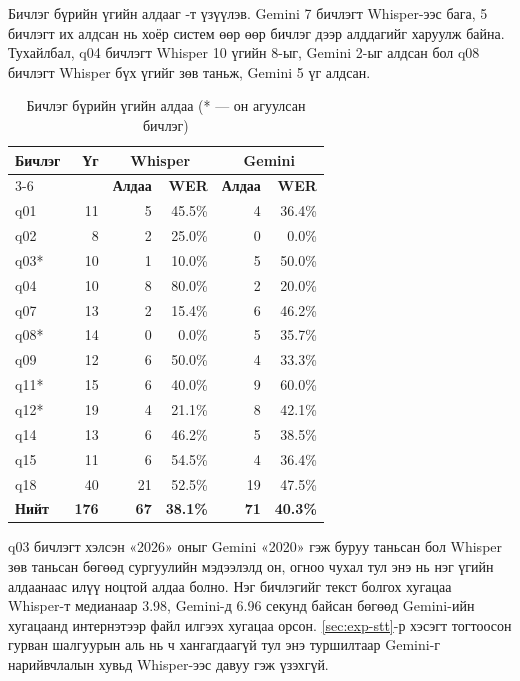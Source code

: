 Бичлэг бүрийн үгийн алдааг -т үзүүлэв. Gemini 7 бичлэгт Whisper-ээс бага, 5 бичлэгт их алдсан нь хоёр систем өөр өөр бичлэг дээр алддагийг харуулж байна. Тухайлбал, q04 бичлэгт Whisper 10 үгийн 8-ыг, Gemini 2-ыг алдсан бол q08 бичлэгт Whisper бүх үгийг зөв таньж, Gemini 5 үг алдсан.

\begin{table}[htbp]
\centering
\caption{Бичлэг бүрийн үгийн алдаа (* — он агуулсан бичлэг)}
\label{tab:stt_per_utt}
\begin{tabular}{|l|r|r|r|r|r|}
\hline
\multirow{2}{*}{\textbf{Бичлэг}} & \multirow{2}{*}{\textbf{Үг}} & \multicolumn{2}{c|}{\textbf{Whisper}} & \multicolumn{2}{c|}{\textbf{Gemini}} \\
\cline{3-6}
 & & \textbf{Алдаа} & \textbf{\acs{WER}} & \textbf{Алдаа} & \textbf{\acs{WER}} \\
\hline
q01 & 11 & 5 & 45.5\% & 4 & 36.4\% \\
q02 & 8 & 2 & 25.0\% & 0 & 0.0\% \\
q03* & 10 & 1 & 10.0\% & 5 & 50.0\% \\
q04 & 10 & 8 & 80.0\% & 2 & 20.0\% \\
q07 & 13 & 2 & 15.4\% & 6 & 46.2\% \\
q08* & 14 & 0 & 0.0\% & 5 & 35.7\% \\
q09 & 12 & 6 & 50.0\% & 4 & 33.3\% \\
q11* & 15 & 6 & 40.0\% & 9 & 60.0\% \\
q12* & 19 & 4 & 21.1\% & 8 & 42.1\% \\
q14 & 13 & 6 & 46.2\% & 5 & 38.5\% \\
q15 & 11 & 6 & 54.5\% & 4 & 36.4\% \\
q18 & 40 & 21 & 52.5\% & 19 & 47.5\% \\
\hline
\textbf{Нийт} & \textbf{176} & \textbf{67} & \textbf{38.1\%} & \textbf{71} & \textbf{40.3\%} \\
\hline
\end{tabular}
\end{table}

q03 бичлэгт хэлсэн «2026» оныг Gemini «2020» гэж буруу таньсан бол Whisper зөв таньсан бөгөөд сургуулийн мэдээлэлд он, огноо чухал тул энэ нь нэг үгийн алдаанаас илүү ноцтой алдаа болно. Нэг бичлэгийг текст болгох хугацаа Whisper-т медианаар 3.98, Gemini-д 6.96 секунд байсан бөгөөд Gemini-ийн хугацаанд интернэтээр файл илгээх хугацаа орсон. \ref{sec:exp-stt}-р хэсэгт тогтоосон гурван шалгуурын аль нь ч хангагдаагүй тул энэ туршилтаар Gemini-г нарийвчлалын хувьд Whisper-ээс давуу гэж үзэхгүй.

